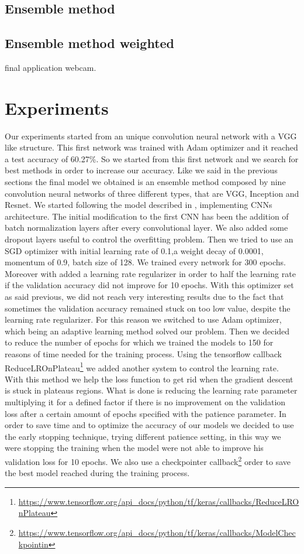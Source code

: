 \documentclass[10pt,twocolumn,letterpaper]{article}
\begin{document}
\subsection*{Ensemble method}
\subsection*{Ensemble method weighted}

final application webcam.
\section{Experiments}
Our experiments started from an unique convolution neural network with a VGG like structure.
This first network was trained with Adam optimizer and it reached a test accuracy of 60.27\%.
So we started from this first network and we search for best methods in order to increase our accuracy.
Like we said in the previous sections the final model we obtained is an ensemble method composed by nine convolution neural networks
of three different types, that are VGG, Inception and Resnet.
We started following the model described in \cite{147}, implementing CNNs architecture.
The initial modification to the first CNN has been the addition of batch normalization layers after every convolutional layer.
We also added some dropout layers useful to control the overfitting problem.
Then we tried to use an SGD optimizer with initial learning rate of 0.1,a weight decay of 0.0001, momentum of 0.9, batch size of 128.
We trained every network for 300 epochs.
Moreover with added a learning rate regularizer in order to half the learning rate if the validation accuracy did not improve for 10 epochs.
With this optimizer set as said previous, we did not reach very interesting results due to the fact that sometimes the validation accuracy
remained stuck on too low value, despite the learning rate regularizer.
For this reason we switched to use Adam optimizer, which being an adaptive learning method solved our problem.
Then we decided to reduce the number of epochs for which we trained the models to 150 for
reasons of time needed for the training process.
Using the tensorflow callback ReduceLROnPlateau\footnote{\url{https://www.tensorflow.org/api_docs/python/tf/keras/callbacks/ReduceLROnPlateau}} 
we added another system to control the learning rate. With this method we help the loss function to get rid when the gradient descent is stuck in plateaus regions.
What is done is reducing the learning rate parameter multiplying it for a defined factor if there is no improvement on the validation loss after a certain amount of epochs specified with the patience parameter.
In order to save time and to optimize the accuracy of our models we decided to use the early stopping technique, trying different patience setting,
in this way we were stopping the training when the model were not able to improve his validation loss for 10 epochs.
We also use a checkpointer callback\footnote{\url{https://www.tensorflow.org/api_docs/python/tf/keras/callbacks/ModelCheckpointin}} order to save the best model reached during the training process.
\end{document}
